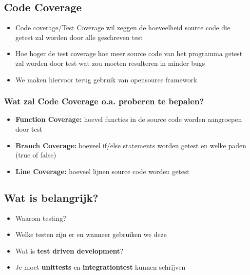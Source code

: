 \documentclass{article}
\begin{document}
\subsection{Code Coverage}

\begin{itemize}
    \item Code coverage/Test Coverage wil zeggen de hoeveelheid source code die getest zal worden door alle geschreven test
    \item Hoe hoger de test coverage hoe meer source code van het programma getest zal worden door test wat zou moeten resulteren in minder bugs
    \item We maken hiervoor terug gebruik van opensource framework
\end{itemize}

\subsubsection{Wat zal Code Coverage o.a. proberen te bepalen?}

\begin{itemize}
    \item \textbf{Function Coverage:} hoevel functies in de source code worden aangroepen door test
    \item \textbf{Branch Coverage:} hoeveel if/else statements worden getest en welke paden (true of false)
    \item \textbf{Line Coverage:} hoeveel lijnen source code worden getest
\end{itemize}

\subsection{Wat is belangrijk?}

\begin{itemize}
    \item Waarom testing?
    \item Welke testen zijn er en wanneer gebruiken we deze
    \item Wat is \textbf{test driven development}?
    \item Je moet \textbf{unittests} en \textbf{integrationtest} kunnen schrijven
\end{itemize}
\end{document}
